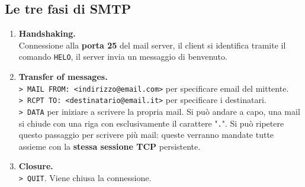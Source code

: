 \subsection{Le tre fasi di SMTP}
\begin{enumerate}
    \item \textbf{Handshaking.}\\
    Connessione alla \textbf{porta 25} del mail server, il client si identifica tramite il comando \verb|HELO|, il server invia un messaggio di benvenuto.
    
    \item \textbf{Transfer of messages.}\\
    \verb|> MAIL FROM: <indirizzo@email.com>| per specificare email del mittente. \\
    \verb|> RCPT TO: <destinatario@email.it>| per specificare i destinatari. \\
    \verb|> DATA| per iniziare a scrivere la propria mail. Si può andare a capo, una mail si chiude con una riga con esclusivamente il carattere "\verb|.|".
    Si può ripetere questo passaggio per scrivere più mail: queste verranno mandate tutte assieme con la \textbf{stessa sessione TCP} persistente.
    
    \item \textbf{Closure.}\\
    \verb|> QUIT|. Viene chiusa la connessione.
\end{enumerate}


